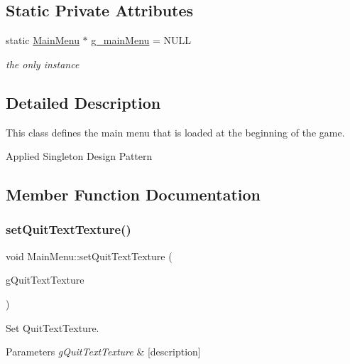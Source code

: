 \subsection*{Static Private Attributes}
\begin{DoxyCompactItemize}
\item 
\mbox{\label{class_main_menu_a529c81d417f43295ede54964db3b5313}} 
static \mbox{\hyperlink{class_main_menu}{Main\+Menu}} $\ast$ \mbox{\hyperlink{class_main_menu_a529c81d417f43295ede54964db3b5313}{g\+\_\+main\+Menu}} = N\+U\+LL
\begin{DoxyCompactList}\small\item\em the only instance \end{DoxyCompactList}\end{DoxyCompactItemize}


\subsection{Detailed Description}
This class defines the main menu that is loaded at the beginning of the game. 

Applied Singleton Design Pattern 

\subsection{Member Function Documentation}
\mbox{\label{class_main_menu_a14e87e2809aa8b367ba569d4718772a5}} 
\subsubsection{\texorpdfstring{set\+Quit\+Text\+Texture()}{setQuitTextTexture()}}
{\footnotesize\ttfamily void Main\+Menu\+::set\+Quit\+Text\+Texture (\begin{DoxyParamCaption}\item[{\mbox{\hyperlink{class_l_texture}{L\+Texture}} $\ast$}]{g\+Quit\+Text\+Texture }\end{DoxyParamCaption})}



Set Quit\+Text\+Texture. 


\begin{DoxyParams}{Parameters}
{\em g\+Quit\+Text\+Texture} & \mbox{[}description\mbox{]} \\
\hline
\end{DoxyParams}


